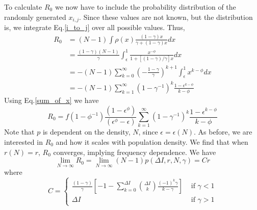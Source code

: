 \documentclass[10pt]{article}
\begin{document}
\begin{multicols}{2}
To calculate $R_{0}$ we now have to include the probability distribution of the randomly generated $x_{i,j}$. Since these values are not known, but the distribution is, we integrate Eq.\eqref{i_to_j} over all possible values. Thus,
\begin{equation}
\label{second_p}
\begin{split}
R_{0}&=(N-1)\int\rho(x)\frac{(1-\gamma)x}{\gamma+(1-\gamma)x}dx\\
&=\frac{(1-\gamma)(N-1)}{\gamma}\int_{\epsilon}^{1}\frac{x^{-\phi}}{1+[(1-\gamma)/\gamma]x}dx\\
&=-(N-1)\sum_{k=0}^{\infty}\left(-\frac{1-\gamma}{\gamma}\right)^{k+1}\int_{\epsilon}^{1}x^{k-\phi}dx\\
&=-(N-1)\sum_{k=1}^{\infty}(1-\gamma^{-1})^{k}\frac{1-\epsilon^{k-\phi}}{k-\phi}
\end{split}
\end{equation}
Using Eq.\eqref{sum_of_x} we have
\begin{equation}
R_{0}=f(1-\phi^{-1})\frac{(1-\epsilon^{\phi})}{(\epsilon^{\phi}-\epsilon)}\sum_{k=1}^{\infty}(1-\gamma^{-1})^{k}\frac{1-\epsilon^{k-\phi}}{k-\phi}
\end{equation}
Note that $p$ is dependent on the density, $N$, since $\epsilon=\epsilon(N)$. As before, we are interested in $R_{0}$ and how it scales with population density. We find that when $r(N)=r$, $R_{0}$ converges, implying frequency dependence. We have
\begin{equation}
\lim_{N\rightarrow\infty}R_{0}=\lim_{N\rightarrow\infty}(N-1)p(\Delta I,r,N,\gamma)=Cr
\end{equation}
where 
\begin{equation}
C = \left\{
  \begin{array}{lr}
    \frac{(1-\gamma)}{\gamma}\left[-1-\sum_{k=0}^{\Delta I}\binom{\Delta I}{k}\frac{(-1)^{k}\gamma}{k-\gamma}\right] & \text{ if }\gamma < 1\\
    \Delta I & \text{ if }\gamma > 1
  \end{array}
\right.
\end{equation}


\end{multicols}
\end{document}
